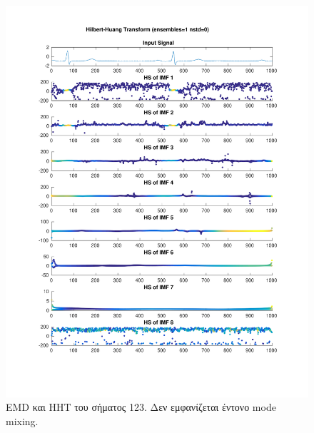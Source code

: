 \documentclass[11pt,a4paper]{article}
\begin{document}
\begin{figure}[H]
\begin{minipage}{0.48\textwidth}
	\includegraphics[width=\textwidth]{fig/123l1_hht.pdf}
\end{minipage}
\vfill
\caption{EMD και HHT του σήματος 123. Δεν εμφανίζεται έντονο mode mixing.}
\label{fig:123l1_hht}
\end{figure}
\end{document}
